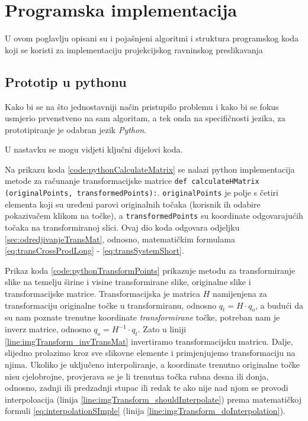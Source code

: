 \chapter{Programska implementacija}
\label{ch:implementacija}

U ovom poglavlju opisani su i pojašnjeni algoritmi i struktura programskog koda koji se koristi za implementaciju projekcijskog ravninskog preslikavanja

\section{Prototip u pythonu}
\label{sec:pythonProto}
\lstset{
	language=Python, 
	tabsize=2,
	numbers=left,
	breaklines=true,
	basicstyle=\ttfamily,
	columns=fixed
}

Kako bi se na što jednostavniji način pristupilo problemu i kako bi se fokus usmjerio prvenstveno na sam algoritam, a tek onda na specifičnosti jezika, za prototipiranje je odabran jezik \textit{Python}.

U nastavku se mogu vidjeti ključni dijelovi koda.



Na prikazu koda \ref{code:pythonCalculateMatrix} se nalazi python implementacija metode za računanje transformacijske matrice \lstinline!def calculateHMatrix (originalPoints, transformedPoints):!. \lstinline!originalPoints! je polje s četiri elementa koji su uređeni parovi originalnih točaka (korisnik ih odabire pokazivačem klikom na točke), a \lstinline!transformedPoints! su koordinate odgovarajućih točaka na transformiranoj slici. Ovaj dio koda odgovara odjeljku \ref{sec:odredjivanjeTransMat}, odnosno, matematičkim formulama \eqref{eq:transCrossProdLong} - \eqref{eq:transSystemShort}.



Prikaz koda \ref{code:pythonTransformPoints} prikazuje metodu za transformiranje slike na temelju širine i visine transformirane slike, originalne slike i transformacijske matrice. Transformacijska je matrica $H$ namijenjena za transformaciju originalne točke u transformiranu, odnosno $q_t = H \cdot q_o$, a budući da su nam poznate trenutne koordinate \emph{transformirane} točke, potreban nam je inverz matrice, odnosno $q_o = H^{-1} \cdot q_t$. Zato u liniji \ref{line:imgTransform_invTransMat} invertiramo transformacijsku matricu. Dalje, slijedno prolazimo kroz sve slikovne elemente i primjenjujemo transformaciju na njima. Ukoliko je uključeno interpoliranje, a koordinate trenutno originalne točke nisu cjelobrojne, provjerava se je li trenutna točka rubna desna ili donja, odnosno, zadnji ili predzadnji stupac ili redak te ako nije nad njom se provodi interpoloacija (linija \ref{line:imgTransform_shouldInterpolate}) prema matematičkoj formuli \eqref{eq:interpolationSImple} (linija \ref{line:imgTransform_doInterpolation}).

